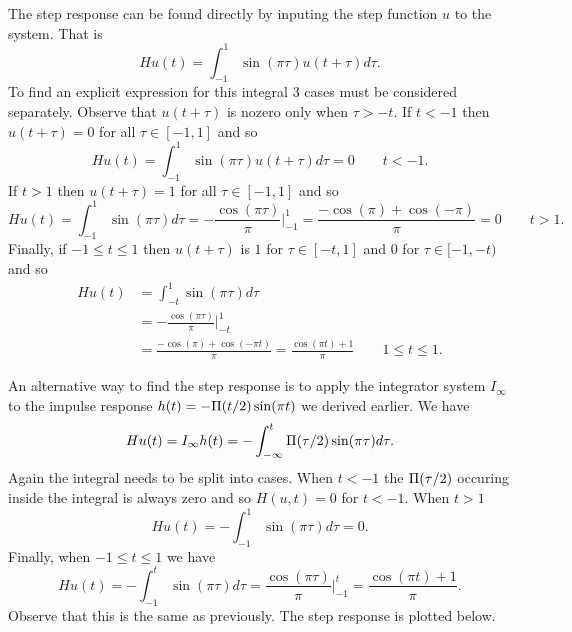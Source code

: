 \begin{excersizelist}
\begin{solution}
The step response can be found directly by inputing the step function $u$ to the system.  That is
\[ 
Hu(t) = \int_{-1}^{1} \sin(\pi\tau) u(t + \tau) d\tau.
\]  
To find an explicit expression for this integral 3 cases must be considered separately.  Observe that $u(t + \tau)$ is nozero only when $\tau > -t$.  If $t < -1$ then $u(t + \tau) = 0$ for all $\tau \in [-1,1]$ and so
\[
Hu(t) = \int_{-1}^{1} \sin(\pi\tau) u(t + \tau) d\tau = 0 \qquad t < -1.
\] 
If $t > 1$ then $u(t + \tau) = 1$ for all $\tau \in [-1,1]$ and so
\[
Hu(t) = \int_{-1}^{1} \sin(\pi\tau) d\tau = -\frac{\cos(\pi\tau)}{\pi} \big\vert_{-1}^1 = \frac{-\cos(\pi) + \cos(-\pi)}{\pi} = 0 \qquad t > 1.
\]
Finally, if $-1 \leq t \leq 1$ then $u(t + \tau)$ is $1$ for $\tau \in [-t,1]$ and $0$ for $\tau \in [-1,-t)$ and so
\begin{align*}
Hu(t) &= \int_{-t}^{1} \sin(\pi\tau) d\tau \\
&= -\frac{\cos(\pi\tau)}{\pi} \big\vert_{-t}^1 \\
&= \frac{-\cos(\pi) + \cos(-\pi t)}{\pi} = \frac{\cos(\pi t) + 1}{\pi} \qquad 1 \leq t \leq 1.
\end{align*}

An alternative way to find the step response is to apply the integrator system $I_\infty$ to the impulse response $h(t) = -\Pi(t/2) \sin(\pi t)$ we derived earlier.  We have
\[
Hu(t) = I_\infty h(t) = -\int_{-\infty}^t \Pi(\tau/2) \sin(\pi \tau) d\tau.
\]
Again the integral needs to be split into cases.  When $t < -1$ the $\Pi(\tau/2)$ occuring inside the integral is always zero and so $H(u,t) = 0$ for $t < -1$.  When $t > 1$ 
\[
Hu(t) = -\int_{-1}^1 \sin(\pi \tau) d\tau = 0.
\]
Finally, when $-1 \leq t \leq 1$ we have
\[
Hu(t) = -\int_{-1}^t \sin(\pi \tau) d\tau  = \frac{\cos(\pi \tau)}{\pi} \big\vert_{-1}^t = \frac{\cos(\pi t) + 1}{\pi}.
\]
Observe that this is the same as previously.  The step response is plotted below.

\begin{center}
\end{center}
\end{solution}
\end{excersizelist}
